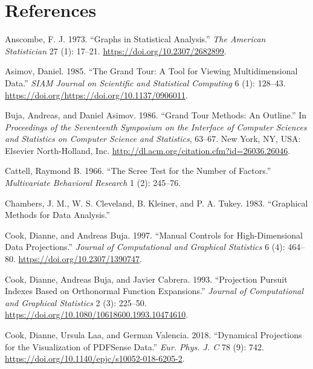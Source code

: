 \documentclass[11,]{article}
\begin{document}
\hypertarget{references}{%
\section*{References}\label{references}}

\hypertarget{refs}{}
\leavevmode\hypertarget{ref-anscombe_graphs_1973}{}%
Anscombe, F. J. 1973. ``Graphs in Statistical Analysis.'' \emph{The American Statistician} 27 (1): 17--21. \url{https://doi.org/10.2307/2682899}.

\leavevmode\hypertarget{ref-asimov_grand_1985}{}%
Asimov, Daniel. 1985. ``The Grand Tour: A Tool for Viewing Multidimensional Data.'' \emph{SIAM Journal on Scientific and Statistical Computing} 6 (1): 128--43. \url{https://doi.org/https://doi.org/10.1137/0906011}.

\leavevmode\hypertarget{ref-buja_grand_1986}{}%
Buja, Andreas, and Daniel Asimov. 1986. ``Grand Tour Methods: An Outline.'' In \emph{Proceedings of the Seventeenth Symposium on the Interface of Computer Sciences and Statistics on Computer Science and Statistics}, 63--67. New York, NY, USA: Elsevier North-Holland, Inc. \url{http://dl.acm.org/citation.cfm?id=26036.26046}.

\leavevmode\hypertarget{ref-cattell_scree_1966}{}%
Cattell, Raymond B. 1966. ``The Scree Test for the Number of Factors.'' \emph{Multivariate Behavioral Research} 1 (2): 245--76.

\leavevmode\hypertarget{ref-chambers_graphical_1983}{}%
Chambers, J. M., W. S. Cleveland, B. Kleiner, and P. A. Tukey. 1983. ``Graphical Methods for Data Analysis.''

\leavevmode\hypertarget{ref-cook_manual_1997}{}%
Cook, Dianne, and Andreas Buja. 1997. ``Manual Controls for High-Dimensional Data Projections.'' \emph{Journal of Computational and Graphical Statistics} 6 (4): 464--80. \url{https://doi.org/10.2307/1390747}.

\leavevmode\hypertarget{ref-cook_projection_1993}{}%
Cook, Dianne, Andreas Buja, and Javier Cabrera. 1993. ``Projection Pursuit Indexes Based on Orthonormal Function Expansions.'' \emph{Journal of Computational and Graphical Statistics} 2 (3): 225--50. \url{https://doi.org/10.1080/10618600.1993.10474610}.

\leavevmode\hypertarget{ref-cook_dynamical_2018}{}%
Cook, Dianne, Ursula Laa, and German Valencia. 2018. ``Dynamical Projections for the Visualization of PDFSense Data.'' \emph{Eur. Phys. J. C} 78 (9): 742. \url{https://doi.org/10.1140/epjc/s10052-018-6205-2}.
\end{document}
